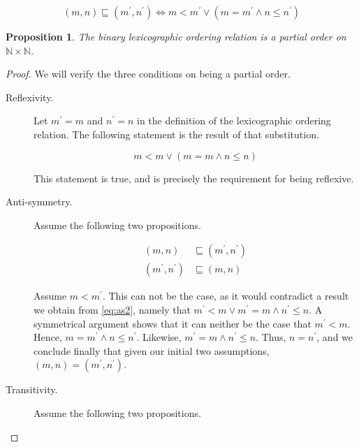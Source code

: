 \documentclass[letterpaper,11pt]{article}
\newcommand{\N}{\mathbb{N}}
\newtheorem{proposition}{Proposition}
\begin{document}
\begin{description}
    $$
    (m,n)\sqsubseteq(m^\prime,n^\prime)
    \iff
    m<m^\prime
    \lor
    (m=m^\prime\land n\leq n^\prime)
    $$

    \begin{proposition}
        The binary lexicographic ordering relation is a partial order on
        $\N\times\N$.
    \end{proposition}

    \begin{proof}
        We will verify the three conditions on being a partial order.

        \begin{description}
            \item[Reflexivity.]
                Let $m^\prime=m$ and $n^\prime=n$ in the definition of
                the lexicographic ordering relation. The following
                statement is the result of that substitution.

                $$
                m<m\lor(m=m\land n\leq n)
                $$

                This statement is true, and is precisely the requirement
                for being reflexive.

            \item[Anti-symmetry.]
                Assume the following two propositions.

                \begin{align}
                    (m,n)&\sqsubseteq(m^\prime,n^\prime)\label{eq:as1}\\
                    (m^\prime,n^\prime)&\sqsubseteq(m,n)\label{eq:as2}
                \end{align}

                Assume $m<m^\prime$. This can not be the case, as it would
                contradict a result we obtain from
                \eqref{eq:as2}, namely that
                $m^\prime<m\lor m^\prime=m\land n^\prime\leq n$.
                A symmetrical argument shows that it can neither be the
                case that $m^\prime<m$.
                Hence,
                $m = m^\prime \land n \leq n^\prime$.
                Likewise,
                $m^\prime = m \land n^\prime \leq n$.
                Thus,
                $n = n^\prime$,
                and we conclude finally that given our initial two
                assumptions,
                $(m, n) = (m^\prime, n^\prime)$.

            \item[Transitivity.]
                Assume the following two propositions.


\end{description}
\end{proof}
\end{description}
\end{document}
